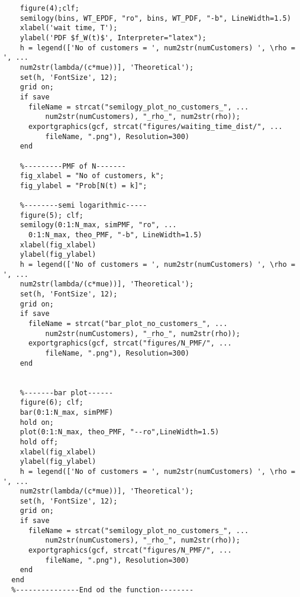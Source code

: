 \begin{lstlisting}[style=Matlab-editor, basicstyle=\ttfamily\footnotesize]
    %------semi logarithmic f_W(t)-----
    figure(4);clf;
    semilogy(bins, WT_EPDF, "ro", bins, WT_PDF, "-b", LineWidth=1.5)
    xlabel('wait time, T');
    ylabel('PDF $f_W(t)$', Interpreter="latex");
    h = legend(['No of customers = ', num2str(numCustomers) ', \rho = ', ...
    num2str(lambda/(c*mue))], 'Theoretical');
    set(h, 'FontSize', 12);
    grid on;
    if save 
      fileName = strcat("semilogy_plot_no_customers_", ...
          num2str(numCustomers), "_rho_", num2str(rho));
      exportgraphics(gcf, strcat("figures/waiting_time_dist/", ...
          fileName, ".png"), Resolution=300)
    end
  
    %---------PMF of N-------
    fig_xlabel = "No of customers, k";
    fig_ylabel = "Prob[N(t) = k]";
  
    %--------semi logarithmic-----
    figure(5); clf;
    semilogy(0:1:N_max, simPMF, "ro", ...
      0:1:N_max, theo_PMF, "-b", LineWidth=1.5)
    xlabel(fig_xlabel)
    ylabel(fig_ylabel)
    h = legend(['No of customers = ', num2str(numCustomers) ', \rho = ', ...
    num2str(lambda/(c*mue))], 'Theoretical');
    set(h, 'FontSize', 12);
    grid on;
    if save
      fileName = strcat("bar_plot_no_customers_", ...
          num2str(numCustomers), "_rho_", num2str(rho));
      exportgraphics(gcf, strcat("figures/N_PMF/", ...
          fileName, ".png"), Resolution=300)
    end
  
  
    %-------bar plot------
    figure(6); clf;
    bar(0:1:N_max, simPMF)
    hold on;
    plot(0:1:N_max, theo_PMF, "--ro",LineWidth=1.5)
    hold off;
    xlabel(fig_xlabel)
    ylabel(fig_ylabel)
    h = legend(['No of customers = ', num2str(numCustomers) ', \rho = ', ...
    num2str(lambda/(c*mue))], 'Theoretical');
    set(h, 'FontSize', 12);
    grid on;
    if save
      fileName = strcat("semilogy_plot_no_customers_", ...
          num2str(numCustomers), "_rho_", num2str(rho));
      exportgraphics(gcf, strcat("figures/N_PMF/", ...
          fileName, ".png"), Resolution=300)
    end
  end
  %---------------End od the function--------
  \end{lstlisting}
  
